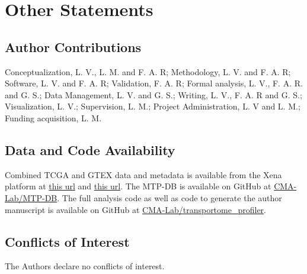 \section{Other Statements}

\subsection{Author Contributions}
Conceptualization, L. V., L. M. and F. A. R;
Methodology, L. V. and F. A. R;
Software, L. V. and F. A. R;
Validation, F. A. R;
Formal analysis, L. V., F. A. R. and G. S.;
Data Management, L. V. and G. S.;
Writing, L. V., F. A. R and G. S.;
Visualization, L. V.;
Supervision, L. M.;
Project Administration, L. V and L. M.;
Funding acquisition, L. M.


\subsection{Data and Code Availability}
Combined TCGA and GTEX data and metadata is available from the Xena platform at
\href{https://toil-xena-hub.s3.us-east-1.amazonaws.com/download/TcgaTargetGtex_gene_expected_count.gz }{this url} and \href{https://toil-xena-hub.s3.us-east-1.amazonaws.com/download/TcgaTargetGTEX_phenotype.txt.gz}{this url}.
The MTP-DB is available on GitHub at \href{https://github.com/CMA-Lab/MTP-DB}{CMA-Lab/MTP-DB}.
The full analysis code as well as  code to generate the author
manuscript is available on GitHub at \href{https://github.com/CMA-Lab/transportome_profiler}{CMA-Lab/transportome\_profiler}.

\subsection{Conflicts of Interest}
The Authors declare no conflicts of interest.